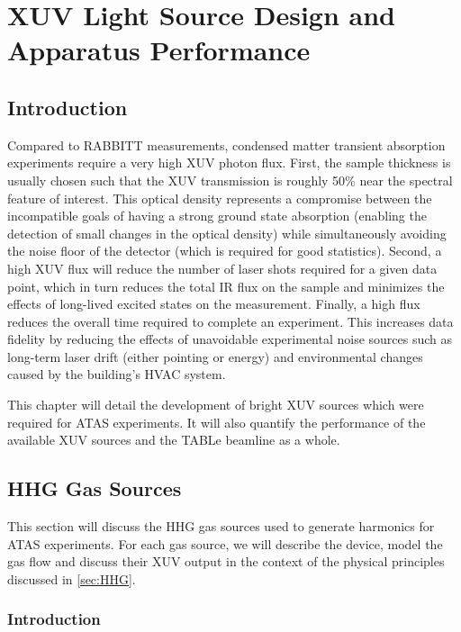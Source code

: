 \chapter{XUV Light Source Design and Apparatus Performance}

\section{Introduction}

Compared to RABBITT measurements, condensed matter transient absorption experiments require a very high XUV photon flux. First, the sample thickness is usually chosen such that the XUV transmission is roughly 50\% near the spectral feature of interest. This optical density represents a compromise between the incompatible goals of having a strong ground state absorption (enabling the detection of small changes in the optical density) while simultaneously avoiding the noise floor of the detector (which is required for good statistics). Second, a high XUV flux will reduce the number of laser shots required for a given data point, which in turn reduces the total IR flux on the sample and minimizes the effects of long-lived excited states on the measurement. Finally, a high flux reduces the overall time required to complete an experiment. This increases data fidelity by reducing the effects of unavoidable experimental noise sources such as long-term laser drift (either pointing or energy) and environmental changes caused by the building's HVAC system.

This chapter will detail the development of bright XUV sources which were required for ATAS experiments. It will also quantify the performance of the available XUV sources and the TABLe beamline as a whole.

\section{HHG Gas Sources}
\label{sec:HHG_gas_sources}

This section will discuss the HHG gas sources used to generate harmonics for ATAS experiments. For each gas source, we will describe the device, model the gas flow and discuss their XUV output in the context of the physical principles discussed in \cref{sec:HHG}.

\subsection{Introduction}

